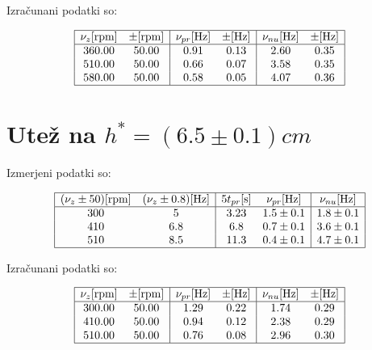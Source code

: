 \documentclass[12pt]{report}
\begin{document}
Izračunani podatki so: 

\begin{tabela}[H]
  \centering
  \[
  \begin{array}{|c c|c c|c c|}\hline
    \nu_z [\si{rpm}] & \pm [\si{rpm}] & \nu_{pr} [\si{Hz}] & \pm [\si{Hz}] & \nu_{nu} [\si{Hz}] & \pm [\si{Hz}] \\\hline
    360.00 &   50.00 &    0.91 &    0.13 &    2.60 &    0.35\\
    510.00 &   50.00 &    0.66 &    0.07 &    3.58 &    0.35\\
    580.00 &   50.00 &    0.58 &    0.05 &    4.07 &    0.36\\ \hline 
  \end{array}
  \]
\end{tabela}

\section*{Utež na $h^*=(6.5 \pm 0.1) \si{cm}$}

Izmerjeni podatki so: 

\begin{tabela}[H]
  \centering
  \[
  \begin{array}{|c c|c c| c|}\hline
    (\nu_z \pm 50) [\si{rpm}] & (\nu_z \pm 0.8) [\si{Hz}] & 5t_{pr} [\si{s}] & \nu_{pr} [\si{Hz}] & \nu_{nu} [\si{Hz}] \\ \hline 
    300 & 5 & 3.23 & 1.5 \pm 0.1 & 1.8 \pm 0.1 \\
    410 & 6.8 & 6.8 & 0.7 \pm 0.1 &  3.6\pm 0.1 \\
    510 & 8.5 & 11.3 & 0.4 \pm 0.1 & 4.7 \pm 0.1 \\ \hline 
  \end{array}
  \]
\end{tabela}

Izračunani podatki so: 

\begin{tabela}[H]
  \centering
  \[
  \begin{array}{|c c|c c|c c|}\hline 
    \nu_z [\si{rpm}] & \pm [\si{rpm}] & \nu_{pr} [\si{Hz}] & \pm [\si{Hz}] & \nu_{nu} [\si{Hz}] & \pm [\si{Hz}] \\\hline
    300.00 &   50.00 &    1.29 &    0.22 &    1.74 &    0.29\\
    410.00 &   50.00 &    0.94 &    0.12 &    2.38 &    0.29\\
    510.00 &   50.00 &    0.76 &    0.08 &    2.96 &    0.30\\ \hline 
  \end{array}
  \]
\end{tabela}
\end{document}
